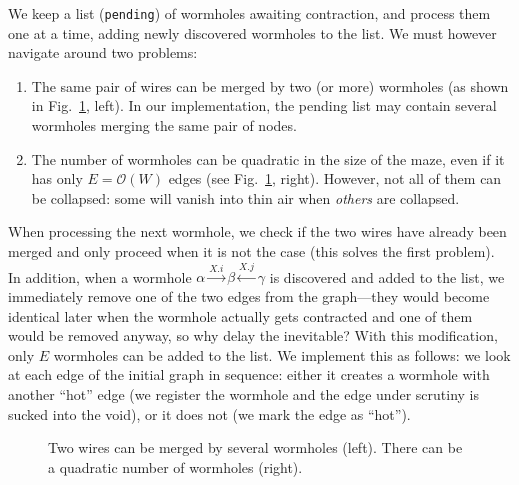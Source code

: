 \documentclass[a4paper,UKenglish,cleveref, autoref]{lipics-v2021}
\newcommand{\bigO}[1]{\ensuremath{\mathcal{O}\left( #1 \right)} }
\begin{document}
We keep a list (\texttt{pending}) of wormholes awaiting contraction, and process
them one at a time, adding newly discovered wormholes to the list. We must
however navigate around two problems:
\begin{enumerate}
\item The same pair of wires can be merged by two (or more) wormholes (as shown
  in Fig.~\ref{fig:wormholes-pb}, left). In our implementation, the pending list
  may contain several wormholes merging the same pair of nodes.

\item The number of wormholes can be quadratic in the size of the maze, even if
  it has only $E = \bigO{W}$ edges (see Fig.~\ref{fig:wormholes-pb},
  right). However, not all of them can be collapsed: some will vanish into thin
  air when \emph{others} are collapsed.
\end{enumerate}

When processing the next wormhole, we check if the two wires have already been
merged and only proceed when it is not the case (this solves the first
problem). In addition, when a wormhole
$\alpha \xrightarrow{X.i} \beta \xleftarrow {X.j} \gamma$ is discovered and
added to the list, we immediately remove one of the two edges from the
graph---they would become identical later when the wormhole actually gets
contracted and one of them would be removed anyway, so why delay the inevitable?
With this modification, only $E$ wormholes can be added to the list. We
implement this as follows: we look at each edge of the initial graph in
sequence: either it creates a wormhole with another ``hot'' edge (we register
the wormhole and the edge under scrutiny is sucked into the void), or
it does not (we mark the edge as ``hot'').

\begin{figure}
  \centering
\caption{\label{fig:wormholes-pb}Two wires can be merged by several wormholes (left). There can be a
  quadratic number of wormholes (right).}
\end{figure}
\end{document}

